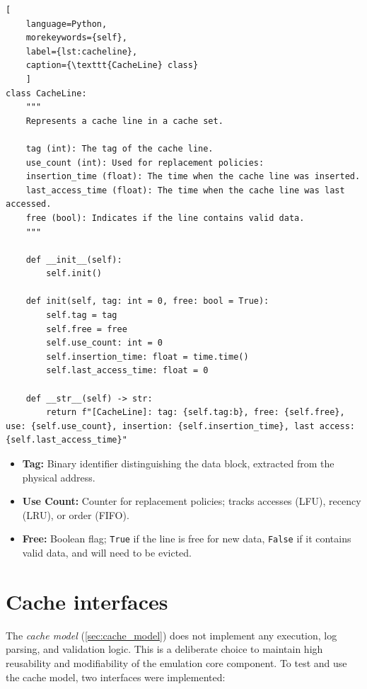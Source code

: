 \begin{center}
\centering
\begin{minipage}{\linewidth}
\begin{lstlisting}[
    language=Python,
	morekeywords={self},
    label={lst:cacheline},
    caption={\texttt{CacheLine} class}
    ]
class CacheLine:
    """
    Represents a cache line in a cache set.

    tag (int): The tag of the cache line.
    use_count (int): Used for replacement policies:
    insertion_time (float): The time when the cache line was inserted.
    last_access_time (float): The time when the cache line was last accessed.
    free (bool): Indicates if the line contains valid data.
    """

    def __init__(self):
        self.init()

    def init(self, tag: int = 0, free: bool = True):
        self.tag = tag
        self.free = free
        self.use_count: int = 0
        self.insertion_time: float = time.time()
        self.last_access_time: float = 0

    def __str__(self) -> str:
        return f"[CacheLine]: tag: {self.tag:b}, free: {self.free}, use: {self.use_count}, insertion: {self.insertion_time}, last access: {self.last_access_time}"
\end{lstlisting}
\end{minipage}
\end{center}

\noindent
\begin{itemize}
    \item \textbf{Tag:} Binary identifier distinguishing the data block, extracted from the physical address.
    \item \textbf{Use Count:} Counter for replacement policies; tracks accesses (LFU), recency (LRU), or order (FIFO).
    \item \textbf{Free:} Boolean flag; \texttt{True} if the line is free for new data, \texttt{False} if it contains valid data, and will need to be evicted.
\end{itemize}


\section{Cache interfaces}

The \textit{cache model} (\ref{sec:cache_model}) does not implement any execution, log parsing, and validation logic. This is a deliberate choice to maintain high reusability and modifiability
of the emulation core component. To test and use the cache model, two interfaces were implemented:

